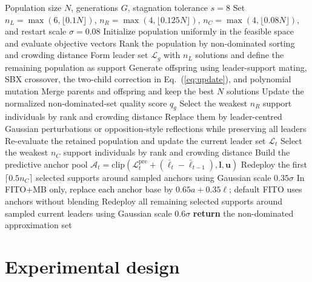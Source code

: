 \documentclass[preprint,12pt]{elsarticle}
\begin{document}
\begin{algorithm}[!t]
\footnotesize
\caption{Formula-Inspired Team Optimization (FITO)}
\label{alg:fito}
\begin{algorithmic}[1]
\REQUIRE Population size $N$, generations $G$, stagnation tolerance $s=8$
\STATE Set $n_L=\max(6,\lfloor0.1N\rfloor)$, $n_R=\max(4,\lfloor0.125N\rfloor)$, $n_C=\max(4,\lfloor0.08N\rfloor)$, and restart scale $\sigma=0.08$
\STATE Initialize population uniformly in the feasible space and evaluate objective vectors
    \STATE Rank the population by non-dominated sorting and crowding distance
    \STATE Form leader set $\mathcal{L}_g$ with $n_L$ solutions and define the remaining population as support
    \STATE Generate offspring using leader-support mating, SBX crossover, the two-child correction in Eq.~(\ref{eq:update}), and polynomial mutation
    \STATE Merge parents and offspring and keep the best $N$ solutions
    \STATE Update the normalized non-dominated-set quality score $q_g$
        \STATE Select the weakest $n_R$ support individuals by rank and crowding distance
        \STATE Replace them by leader-centred Gaussian perturbations or opposition-style reflections while preserving all leaders
    \ENDIF
        \STATE Re-evaluate the retained population and update the current leader set $\mathcal{L}_t$
        \STATE Select the weakest $n_C$ support individuals by rank and crowding distance
            \STATE Build the predictive anchor pool $\mathcal{A}_t=\mathrm{clip}(\mathcal{L}^{\mathrm{pre}}_t+(\bar{\ell}_t-\bar{\ell}_{t-1}),\mathbf{l},\mathbf{u})$
            \STATE Redeploy the first $\lceil0.5n_C\rceil$ selected supports around sampled anchors using Gaussian scale $0.35\sigma$
            \STATE In FITO+MB only, replace each anchor base by $0.65a+0.35\ell$; default FITO uses anchors without blending
        \ENDIF
        \STATE Redeploy all remaining selected supports around sampled current leaders using Gaussian scale $0.6\sigma$
    \ENDIF
\ENDFOR
\STATE \textbf{return} the non-dominated approximation set
\end{algorithmic}
\end{algorithm}

\section{Experimental design}
\label{sec:experiments}
\end{document}
